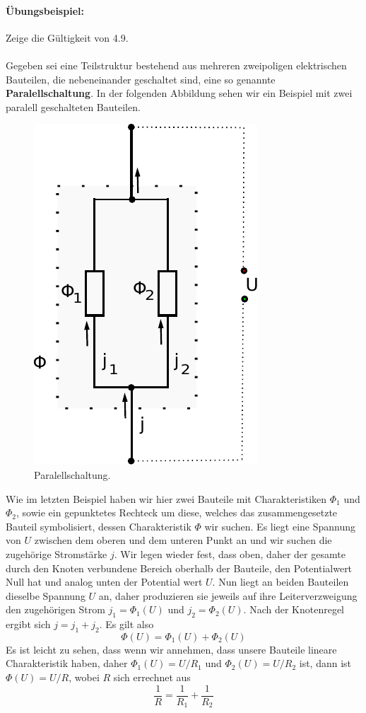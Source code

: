 \documentclass[11pt,a4paper,leqno]{report}
\numberwithin{equation}{chapter}
\begin{document}
\paragraph{\"Ubungsbeispiel:} Zeige die G\"ultigkeit von 4.9.
\\
\\
Gegeben sei eine Teilstruktur bestehend aus mehreren zweipoligen elektrischen Bauteilen, die nebeneinander geschaltet sind, eine so genannte \textbf{Paralellschaltung}. In der folgenden Abbildung sehen wir ein Beispiel mit zwei paralell geschalteten Bauteilen.
\begin{figure}[H]
	\begin{center}
		\includegraphics[scale=0.75]{Parallel.pdf}
		\caption{Paralellschaltung.}
	\end{center}
\end{figure}
\noindent
Wie im letzten Beispiel haben wir hier zwei Bauteile mit Charakteristiken $\Phi_1$ und $\Phi_2$, sowie ein gepunktetes Rechteck um diese, welches das zusammengesetzte Bauteil symbolisiert, dessen Charakteristik $\Phi$ wir suchen. Es liegt eine Spannung von $U$ zwischen dem oberen und dem unteren Punkt an und wir suchen die zugeh\"orige Stromst\"arke $j$. Wir legen wieder fest, dass oben, daher der gesamte durch den Knoten verbundene Bereich oberhalb der Bauteile, den Potentialwert Null hat und analog unten der Potential wert $U$. Nun liegt an beiden Bauteilen dieselbe Spannung $U$ an, daher produzieren sie jeweils auf ihre Leiterverzweigung den zugeh\"origen Strom $j_1 = \Phi_1(U)$ und $j_2 = \Phi_2(U)$. Nach der Knotenregel ergibt sich $j = j_1 + j_2$. Es gilt also 
\begin{equation}
	\Phi(U) = \Phi_1(U) + \Phi_2(U)
\end{equation}
Es ist leicht zu sehen, dass wenn wir annehmen, dass unsere Bauteile lineare Charakteristik haben, daher $\Phi_1(U) = U / R_1$ und $\Phi_2(U) = U / R_2$ ist, dann ist $\Phi(U) = U / R$, wobei $R$ sich errechnet aus
\begin{equation*}
	\frac{1}{R} = \frac{1}{R_1} + \frac{1}{R_2}
\end{equation*}
\end{document}
